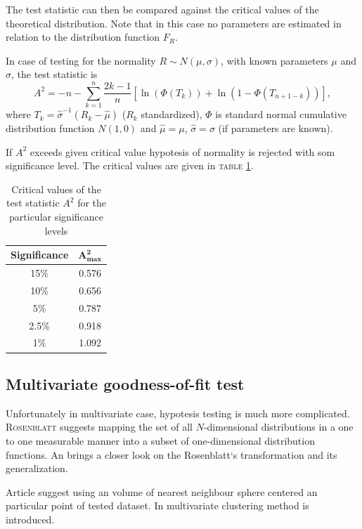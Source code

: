 \documentclass[a4paper,journal]{IEEEtran}
\begin{document}
The test statistic can then be compared against the critical values of the theoretical distribution.
Note that in this case no parameters are estimated in relation to the distribution function $F_R$.

In case of testing for the normality $R \sim N(\mu, \sigma)$, with known parameters $\mu$ and $\sigma$, 
the test statistic is
\begin{equation}
A^2=-n-\sum_{k=1}^n \frac{2k-1}{n}\left[\ln( \Phi(T_k)) + \ln\left(1-\Phi(T_{n+1-k})\right)\right],
\end{equation}
where $T_k = \hat\sigma^{-1}(R_k - \hat\mu)$ ($R_k$ standardized), 
$\Phi$ is standard normal cumulative distribution function $N(1,0)$
and  $\hat\mu = \mu$, $\hat\sigma = \sigma$ (if parameters are known). 

If $A^2$ exceeds given critical value hypotesis of normality is rejected with som significance level.
The critical values are given in \textsc{table \ref{tbl:crit}}.

\begin{table}[!h]
\caption{Critical values of the test statistic $A^2$ for the particular significance levels}
\begin{center}
\begin{tabular}{|c|c|}\hline
\textbf{Significance} & $\mathbf{A^2_{max}}$ \\ \hline
15\% & 0.576 \\ \hline
10\% & 0.656 \\ \hline
5\% & 0.787 \\ \hline
2.5\% & 0.918 \\ \hline
1\% & 1.092 \\ \hline
\end{tabular}
\end{center}
\label{tbl:crit}
\end{table}
\subsection{Multivariate goodness-of-fit test}
Unfortunately in multivariate case, hypotesis testing is much more complicated. \textsc{Rosenblatt} \cite{Ros62} suggests 
mapping the set of all $N$-dimensional distributions in a one to one measurable manner into a subset of one-dimensional
distribution functions. An \cite{Bro08} brings a closer look on the Rosenblatt`s transformation and its generalization.

Article \cite{BicBre83} suggest using an volume of nearest neighbour sphere centered an particular point of tested dataset.
In \cite{Nar03} multivariate clustering method is introduced.
\end{document}
